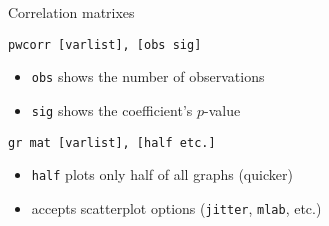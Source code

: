 \documentclass[t]{beamer}
\begin{document}
    \begin{frame}[c]{Correlation matrixes}
		
		\begin{block}{\texttt{pwcorr [varlist], [obs sig]}}

	        \begin{itemize}
	          \item \texttt{obs} shows the number of observations
			  \item \texttt{sig} shows the coefficient's $p$-value
	        \end{itemize}

		\end{block}

		\begin{block}{\texttt{gr mat [varlist], [half etc.]}}		

	        \begin{itemize}
	          \item \texttt{half} plots only half of all graphs (quicker)
			  \item accepts scatterplot options (\texttt{jitter}, \texttt{mlab}, etc.)
	        \end{itemize}

		\end{block}
		
	
	\end{frame}

\end{document}

